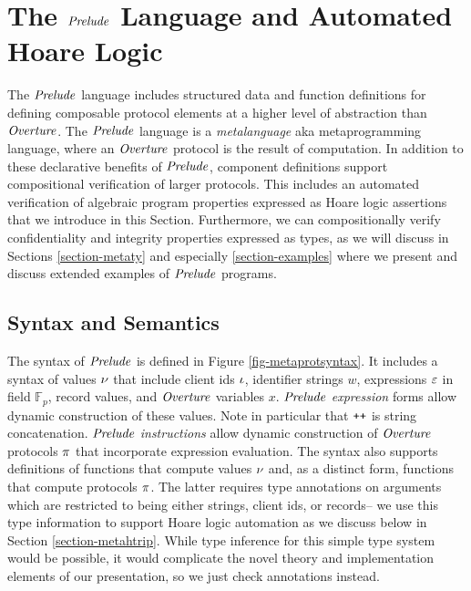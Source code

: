 \section{The $\mathit{Prelude}$ Language and Automated Hoare Logic}
\label{section-metalang}

The $\mathit{Prelude}$ language \cite{skalka-near-ppdp24} includes structured
data and function definitions for defining composable protocol
elements at a higher level of abstraction than $\mathit{Overture}$.  The
$\mathit{Prelude}$ language is a \emph{metalanguage} aka metaprogramming
language, where an $\mathit{Overture}$ protocol is the result of
computation. In addition to these declarative benefits of $\mathit{Prelude}$,
component definitions support compositional verification of larger
protocols. This includes an automated verification of algebraic
program properties expressed as Hoare logic assertions that we
introduce in this Section. Furthermore, we can compositionally verify
confidentiality and integrity properties expressed as types, as we
will discuss in Sections \ref{section-metaty} and especially
\ref{section-examples} where we present and discuss
extended examples of $\mathit{Prelude}$ programs.

\metaprotsyntaxfig

\subsection{Syntax and Semantics}

The syntax of $\mathit{Prelude}$ is defined in Figure
\ref{fig-metaprotsyntax}.  It includes a syntax of values $\nu$ that
include client ids $\iota$, identifier strings $w$, expressions $\varepsilon$
in field $\mathbb{F}_p$, record values, and $\mathit{Overture}$ variables
$x$. $\mathit{Prelude}$ \emph{expression} forms allow dynamic construction of these
values. Note in particular that $\texttt{++}$ is string concatenation.
$\mathit{Prelude}$ \emph{instructions} allow dynamic
construction of $\mathit{Overture}$ protocols $\pi$ that incorporate expression
evaluation. The syntax also supports definitions of functions that
compute values $\nu$ and, as a distinct form, functions that compute
protocols $\pi$.  The latter requires type annotations on arguments
which are restricted to being either strings, client ids, or
records-- we use this type information to support Hoare logic
automation as we discuss below in Section \ref{section-metahtrip}.
While type inference for this simple type system would be possible,
it would complicate the novel theory and implementation elements
of our presentation, so we just check annotations instead.

